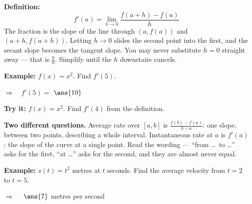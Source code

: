\documentclass[12pt]{article}
\begin{document}


\begin{formulabox}
\textbf{Definition:}
\[
  f'(a) = \lim_{h \to 0} \frac{f(a+h) - f(a)}{h}
\]
The fraction is the slope of the line through $(a, f(a))$ and
$(a+h, f(a+h))$. Letting $h \to 0$ slides the second point into the first, and
the secant slope becomes the tangent slope. You may never substitute $h = 0$
straight away --- that is $\frac{0}{0}$. Simplify until the $h$ downstairs
cancels.
\end{formulabox}

\begin{examplebox}
\textbf{Example:} \quad $f(x) = x^2$. Find $f'(5)$.

$\Rightarrow\quad f'(5) = $ $\ans{10}$
\end{examplebox}

\begin{tryitbox}
\textbf{Try it:} \quad $f(x) = x^2$. Find $f'(4)$ from the definition.\\[2pt]
\end{tryitbox}


\begin{formulabox}
\textbf{Two different questions.} Average rate over $[a,b]$ is
$\frac{f(b)-f(a)}{b-a}$: one slope, between two points, describing a whole
interval. Instantaneous rate at $a$ is $f'(a)$: the slope of the curve at a
single point. Read the wording --- ``from \dots\ to \dots'' asks for the first,
``at \dots'' asks for the second, and they are almost never equal.
\end{formulabox}

\begin{examplebox}
\textbf{Example:} \quad $s(t) = t^2$ metres at $t$ seconds. Find the average
velocity from $t = 2$ to $t = 5$.

$\Rightarrow\quad$ $\ans{7}$ metres per second
\end{examplebox}
\end{document}
